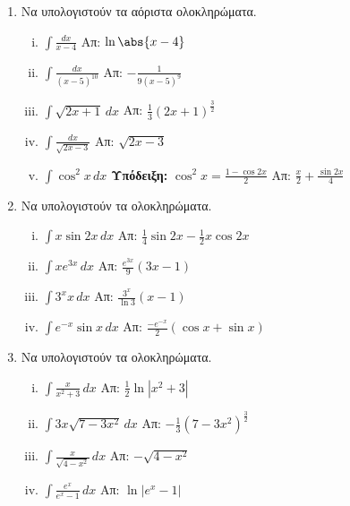 \documentclass[a4paper,table]{report}
\begin{document}
\begin{center}
  \minibox{{\bfseries \large \textcolor{Col1}{Ασκήσεις στα Ολοκληρώματα}}}
\end{center}

\vspace{\baselineskip}


\begin{enumerate}
  \item Να υπολογιστούν τα αόριστα ολοκληρώματα.
    \begin{enumerate}[i)]
      \item $ \int \frac{dx}{x-4}$ \hfill Απ: $ \ln{\abs{x-4}} $ 
      \item $\int\frac{dx}{(x-5)^{10}} $ \hfill Απ: $-\frac{1}{9(x-5)^9}$
      \item $ \int \sqrt{ 2x+1 } \,{dx} $ \hfill Απ: 
        $ \frac{ 1 }{ 3 } (2x+1)^{\frac{ 3 }{ 2 } } $
      \item $ \int\frac{dx}{\sqrt{2x-3}}$ \hfill Απ: $ \sqrt{2x-3} $
      \item $\int\cos^2x \, dx$ \quad
        \textcolor{Col1}{\textbf{Υπόδειξη:}} $ \cos^{2}{x} = \frac{1- \cos{2x}}{2} $
        \hfill Απ: $\frac{x}{2} + \frac{\sin2x}{4}$
    \end{enumerate}

  \item Να υπολογιστούν τα ολοκληρώματα.
    \begin{enumerate}[i)]
      \item $\int x\sin2x \, dx$ \hfill Απ: $\frac{1}{4}\sin2x-\frac{1}{2}x\cos2x$
      \item $\int xe^{3x} \, dx$ \hfill Απ: $\frac{e^{3x}}{9}(3x-1)$
      \item $\int 3^{x}x \, dx$ \hfill Απ: $\frac{3^x}{\ln 3}(x-1)$
      \item $\int e^{-x}\sin x \, dx$ 
        \hfill Απ: $\frac{-e^{-x}}{2}(\cos x+\sin x)$
    \end{enumerate}

  \item Να υπολογιστούν τα ολοκληρώματα.
    \begin{enumerate}[i)]
      \item $\int\frac{x}{x^2+3} \, dx$ \hfill Απ: $\frac{1}{2}\ln|x^2+3|$
      \item $ \int 3x \sqrt{ 7-3x^{2} } \,{dx} $ 
        \hfill Απ: $ - \frac{1}{ 3 } (7-3x^{2})^{\frac{ 3 }{ 2 }} $
      \item $ \int \frac{x}{\sqrt{4-x^{2}}} \,{dx} $ \hfill Απ: $ - \sqrt{4-x^{2}} $ 
      \item $\int \frac{e^x}{e^x-1} \, dx$ \hfill Απ: $\ln|e^x-1|$
    \end{enumerate}


\end{enumerate}
\end{document}

